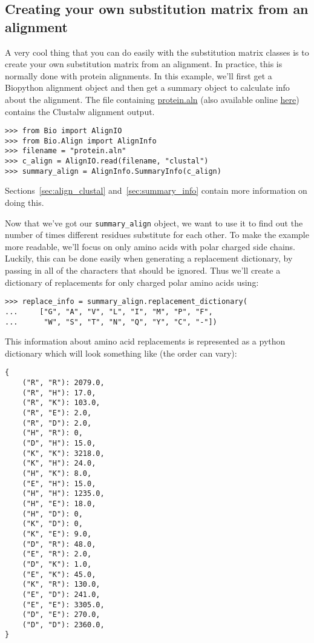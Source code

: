 \subsection{Creating your own substitution matrix from an alignment}
\label{sec:subs_mat_ex}

A very cool thing that you can do easily with the substitution matrix
classes is to create your own substitution matrix from an
alignment. In practice, this is normally done with protein
alignments. In this example, we'll first get a Biopython alignment
object and then get a summary object to calculate info about the
alignment. The file containing \href{examples/protein.aln}{protein.aln}
(also available online
\href{https://raw.githubusercontent.com/biopython/biopython/master/Doc/examples/protein.aln}{here})
contains the Clustalw alignment output.

\begin{verbatim}
>>> from Bio import AlignIO
>>> from Bio.Align import AlignInfo
>>> filename = "protein.aln"
>>> c_align = AlignIO.read(filename, "clustal")
>>> summary_align = AlignInfo.SummaryInfo(c_align)
\end{verbatim}

Sections~\ref{sec:align_clustal} and~\ref{sec:summary_info} contain
more information on doing this.

Now that we've got our \verb|summary_align| object, we want to use it
to find out the number of times different residues substitute for each
other. To make the example more readable, we'll focus on only amino
acids with polar charged side chains. Luckily, this can be done easily
when generating a replacement dictionary, by passing in all of the
characters that should be ignored. Thus we'll create a dictionary of
replacements for only charged polar amino acids using:

\begin{verbatim}
>>> replace_info = summary_align.replacement_dictionary(
...     ["G", "A", "V", "L", "I", "M", "P", "F",
...      "W", "S", "T", "N", "Q", "Y", "C", "-"])
\end{verbatim}

This information about amino acid replacements is represented as a
python dictionary which will look something like (the order can vary):

\begin{verbatim}
{
    ("R", "R"): 2079.0,
    ("R", "H"): 17.0,
    ("R", "K"): 103.0,
    ("R", "E"): 2.0,
    ("R", "D"): 2.0,
    ("H", "R"): 0,
    ("D", "H"): 15.0,
    ("K", "K"): 3218.0,
    ("K", "H"): 24.0,
    ("H", "K"): 8.0,
    ("E", "H"): 15.0,
    ("H", "H"): 1235.0,
    ("H", "E"): 18.0,
    ("H", "D"): 0,
    ("K", "D"): 0,
    ("K", "E"): 9.0,
    ("D", "R"): 48.0,
    ("E", "R"): 2.0,
    ("D", "K"): 1.0,
    ("E", "K"): 45.0,
    ("K", "R"): 130.0,
    ("E", "D"): 241.0,
    ("E", "E"): 3305.0,
    ("D", "E"): 270.0,
    ("D", "D"): 2360.0,
}
\end{verbatim}


